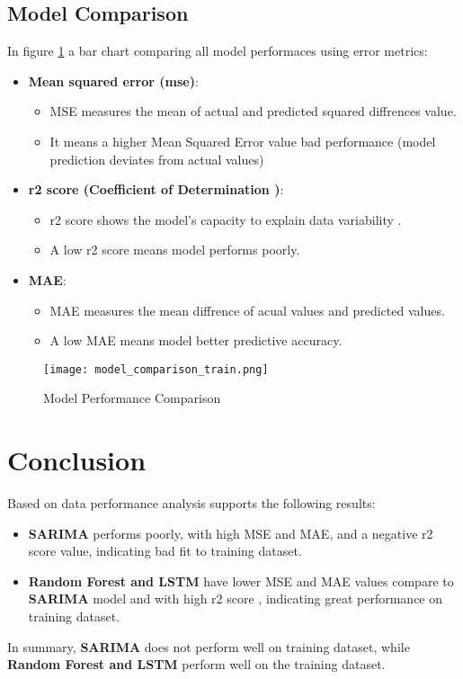 \subsection{Model Comparison}
In figure \ref{fig:comparison} a bar chart comparing all model performaces using error metrics:
\begin{itemize}
    \item \textbf{Mean squared error (mse)}:
        \begin{itemize}
        \item MSE measures the mean of actual and predicted squared diffrences value.
        \item It means a higher Mean Squared Error value  bad performance (model prediction deviates from actual values)
        \end{itemize}
    \item \textbf{r2 score (Coefficient of Determination )}:
    \begin{itemize}
    
        \item r2 score shows the model's capacity to explain data variability .
        \item A low r2 score means model performs poorly. 
    \end{itemize}
    \item \textbf{MAE}:
        \begin{itemize}

        \item MAE measures the mean diffrence of acual values and predicted values.
        \item A low MAE means model better predictive accuracy. 
        \end{itemize}
\end{itemize}

\begin{figure}[H]
    \centering
    \texttt{[image: model\_comparison\_train.png]}
    \caption{Model Performance Comparison}
    \label{fig:comparison}
\end{figure}

\section{Conclusion}
Based on  data performance analysis supports the following results:\begin{itemize}
    \item \textbf{SARIMA} performs poorly, with high MSE and MAE, and a negative r2 score value, indicating bad fit to training dataset.
    \item \textbf{Random Forest and LSTM} have lower MSE and MAE values compare to \textbf{SARIMA} model and with high r2 score , indicating great performance on training dataset.
\end{itemize}

In summary, \textbf{SARIMA} does not perform well on  training dataset, while \textbf{ Random Forest and LSTM} perform well on the training dataset.

